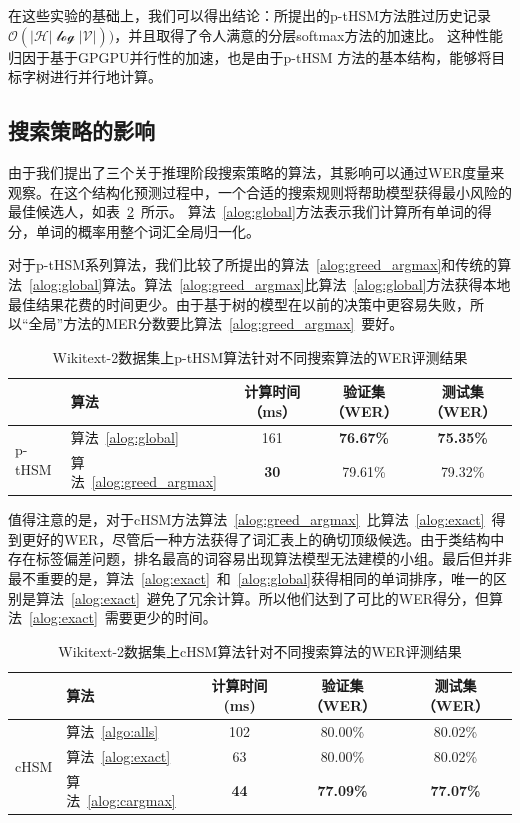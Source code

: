 在这些实验的基础上，我们可以得出结论：所提出的p-tHSM方法胜过历史记录$ \mathcal{O(| H | \log| V |)})$，并且取得了令人满意的分层softmax方法的加速比。 这种性能归因于基于GPGPU并行性的加速，也是由于p-tHSM 方法的基本结构，能够将目标字树进行并行地计算。


\subsection{搜索策略的影响}
由于我们提出了三个关于推理阶段搜索策略的算法，其影响可以通过WER度量来观察。在这个结构化预测过程中，一个合适的搜索规则将帮助模型获得最小风险的最佳候选人，如表~\ref{tab:search}~所示。 算法~\ref{alog:global}方法表示我们计算所有单词的得分，单词的概率用整个词汇全局归一化。

对于p-tHSM系列算法，我们比较了所提出的算法~\ref{alog:greed_argmax}和传统的算法~\ref{alog:global}算法。算法~\ref{alog:greed_argmax}比算法~\ref{alog:global}方法获得本地最佳结果花费的时间更少。由于基于树的模型在以前的决策中更容易失败，所以“全局”方法的MER分数要比算法~\ref{alog:greed_argmax}~要好。
\begin{table}[!ht]
  \centering
  \caption{Wikitext-2数据集上p-tHSM算法针对不同搜索算法的WER评测结果\label{tab:psearch2}}
\begin{tabular}{llccc}
  \toprule
        & 算法&计算时间（ms）&验证集（WER）& 测试集（WER）\\ \midrule
  \multirow{2}{*}{p-tHSM}  &算法~\ref{alog:global}&161& \textbf{76.67\%}&\textbf{75.35\%}\\
        &算法~\ref{alog:greed_argmax}&\textbf{30} & 79.61\%&79.32\%\\
  \bottomrule
\end{tabular}
\end{table}

值得注意的是，对于cHSM方法算法~\ref{alog:greed_argmax}~比算法~\ref{alog:exact}~得到更好的WER，尽管后一种方法获得了词汇表上的确切顶级候选。由于类结构中存在标签偏差问题，排名最高的词容易出现算法模型无法建模的小组。最后但并非最不重要的是，算法~\ref{alog:exact}~和~\ref{alog:global}获得相同的单词排序，唯一的区别是算法~\ref{alog:exact}~避免了冗余计算。所以他们达到了可比的WER得分，但算法~\ref{alog:exact}~需要更少的时间。

\begin{table}[!ht]
  \centering
  \caption{Wikitext-2数据集上cHSM算法针对不同搜索算法的WER评测结果\label{tab:search}}
\begin{tabular}{llccc}
  \toprule
   & 算法&计算时间 (ms)&验证集（WER）& 测试集（WER）\\ \midrule
  \multirow{3}{*}{cHSM} &算法~\ref{algo:alls}&102& 80.00\%& 80.02\%\\
        &算法~\ref{alog:exact}&63& 80.00\%& 80.02\%\\
        &算法~\ref{alog:cargmax}&\textbf{44}&\textbf{ 77.09\%}&\textbf{ 77.07\%}\\
  \bottomrule
\end{tabular}
\end{table}


